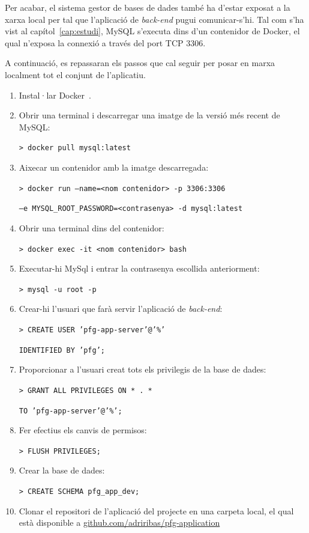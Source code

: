 \documentclass[a4paper,12pt]{ThesisStyle}
\begin{document}
Per acabar, el sistema gestor de bases de dades també ha d'estar exposat a la xarxa local per tal que l'aplicació de \textit{back-end} pugui comunicar-s'hi. Tal com s'ha vist al capítol~\ref{cap:estudi}, MySQL s'executa dins d'un contenidor de Docker, el qual n'exposa la connexió a través del port TCP 3306.

A continuació, es repassaran els passos que cal seguir per posar en marxa localment tot el conjunt de l'aplicatiu.
\begin{enumerate}
  \item Instal·lar Docker~\cite{Docker}.
  \item Obrir una terminal i descarregar una imatge de la versió més recent de MySQL:\\
    \centerline{\texttt{> docker pull mysql:latest}}
  \item Aixecar un contenidor amb la imatge descarregada:\\
    \centerline{\texttt{> docker run ---name=<nom contenidor> -p 3306:3306}}
    \centerline{\texttt{--e MYSQL\_ROOT\_PASSWORD=<contrasenya> -d mysql:latest}}
  \item Obrir una terminal dins del contenidor:\\
    \centerline{\texttt{> docker exec -it <nom contenidor> bash}}
  \item Executar-hi MySql i entrar la contrasenya escollida anteriorment:\\
    \centerline{\texttt{> mysql -u root -p}}
  \item Crear-hi l'usuari que farà servir l'aplicació de \textit{back-end}:\\
    \centerline{\texttt{> CREATE USER 'pfg-app-server'@'\%'}}
    \centerline{\texttt{IDENTIFIED BY 'pfg';}}
  \item Proporcionar a l'usuari creat tots els privilegis de la base de dades:\\
    \centerline{\texttt{> GRANT ALL PRIVILEGES ON * . *}}
    \centerline{\texttt{TO 'pfg-app-server'@'\%';}}
  \item Fer efectius els canvis de permisos:\\
    \centerline{\texttt{> FLUSH PRIVILEGES;}}
  \item Crear la base de dades:\\
    \centerline{\texttt{> CREATE SCHEMA pfg\_app\_dev;}}
  \item Clonar el repositori de l'aplicació del projecte en una carpeta local, el qual està disponible a \href{https://github.com/adriribas/pfg-application}{github.com/adriribas/pfg-application}

\end{enumerate}
\end{document}
